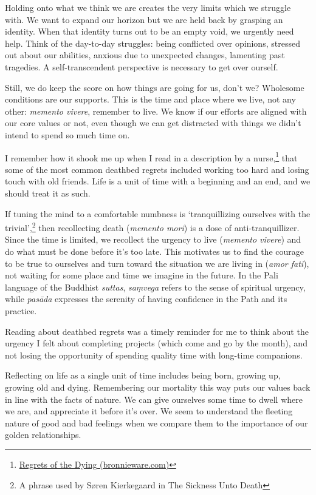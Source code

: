 Holding onto what we think we are creates the very limits which we
struggle with. We want to expand our horizon but we are held back by
grasping an identity. When that identity turns out to be an empty void,
we urgently need help. Think of the day-to-day struggles: being
conflicted over opinions, stressed out about our abilities, anxious due
to unexpected changes, lamenting past tragedies. A self-transcendent
perspective is necessary to get over ourself.

Still, we do keep the score on how things are going for us, don't we?
Wholesome conditions are our supports. This is the time and place where
we live, not any other: \emph{memento vivere}, remember to live. We know
if our efforts are aligned with our core values or not, even though we
can get distracted with things we didn't intend to spend so much time
on.

I remember how it shook me up when I read in a description by a
nurse,\footnote{\href{https://bronnieware.com/blog/regrets-of-the-dying/}{Regrets
  of the Dying (bronnieware.com)}} that some of the most common deathbed
regrets included working too hard and losing touch with old friends.
Life is a unit of time with a beginning and an end, and we should treat
it as such.


If tuning the mind to a comfortable numbness is `tranquillizing
ourselves with the trivial',\footnote{A phrase used by Søren Kierkegaard
  in The Sickness Unto Death} then recollecting death (\emph{memento
mori}) is a dose of anti-tranquillizer. Since the time is limited, we
recollect the urgency to live (\emph{memento vivere}) and do what must
be done before it's too late. This motivates us to find the courage to
be true to ourselves and turn toward the situation we are living in
(\emph{amor fati}), not waiting for some place and time we imagine in
the future. In the Pali language of the Buddhist \emph{suttas},
\emph{saṃvega} refers to the sense of spiritual urgency, while
\emph{pasāda} expresses the serenity of having confidence in the Path
and its practice.

Reading about deathbed regrets was a timely reminder for me to think
about the urgency I felt about completing projects (which come and go by
the month), and not losing the opportunity of spending quality time with
long-time companions.

Reflecting on life as a single unit of time includes being born, growing
up, growing old and dying. Remembering our mortality this way puts our
values back in line with the facts of nature. We can give ourselves some
time to dwell where we are, and appreciate it before it's over. We seem
to understand the fleeting nature of good and bad feelings when we
compare them to the importance of our golden relationships.

